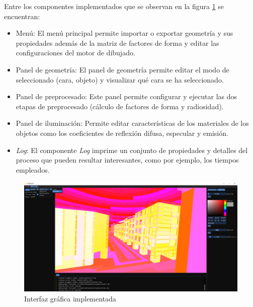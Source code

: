 Entre los componentes implementados que se observan en la figura \ref{img:ui-ex} se encuentran:

\begin{itemize}
	\item Menú: El menú principal permite importar o exportar geometría y sus propiedades además de la matriz de factores de forma y editar las configuraciones del motor de dibujado.
	\item Panel de geometría: El panel de geometría permite editar el modo de seleccionado (cara, objeto) y visualizar qué cara se ha seleccionado.
	\item Panel de preprocesado: Este panel permite configurar y ejecutar las dos etapas de preprocesado (cálculo de factores de forma y radiosidad).
	\item Panel de iluminación: Permite editar características de los materiales de los objetos como los coeficientes de reflexión difusa, especular y emisión.
	\item \textit{Log}: El componente \textit{Log} imprime un conjunto de propiedades y detalles del proceso que pueden resultar interesantes, como por ejemplo, los tiempos empleados.
\end{itemize}

\begin{figure}[H]
	\centering
	\includegraphics[width=1\linewidth]{assets/ui-ex}
	\caption{Interfaz gráfica implementada}
	\label{img:ui-ex}
\end{figure}